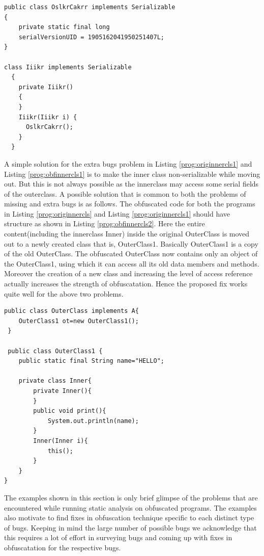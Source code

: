 \documentclass[twocolumn]{article}
\begin{document}
\tiny\begin{lstlisting}[frame=single]
 public class OslkrCakrr implements Serializable
{
	private static final long 
	serialVersionUID = 1905162041950251407L;
}

class Iiikr implements Serializable
  {
    private Iiikr()
    {
    }
    Iiikr(Iiikr i) {
      OslkrCakrr();
    }
  }
\end{lstlisting}
\normalsize
A simple solution for the extra bugs problem in Listing \ref{prog:originnercls1} and Listing \ref{prog:obfinnercls1} is to make the inner class non-serializable while moving out. But 
this is not always possible as the innerclass may access some serial fields of the outerclass. A possible solution that is common to both the problems of missing and extra bugs is as 
follows. The obfuscated code for both the programs in Listing \ref{prog:originnercls} and Listing \ref{prog:originnercls1} should have structure as shown in Listing \ref{prog:obfinnercls2}.
Here the entire content(including the innerclass Inner) inside the original OuterClass is moved out to a newly created class that is, OuterClass1. Basically OuterClass1 is a copy of the 
old OuterClass. The obfuscated OuterClass now contains only an object of the OuterClass1, using which it can access all its old data members and methods. Moreover the creation of a new 
class and increasing the level of access reference actually increases the strength of obfuscatation. Hence the proposed fix works quite well for the above two problems.
\tiny\begin{lstlisting}[frame=single]
 public class OuterClass implements A{
	OuterClass1 ot=new OuterClass1();
 }
 
 public class OuterClass1 {
	public static final String name="HELLO";
	
	private class Inner{
		private Inner(){
		}
		public void print(){
			System.out.println(name);
		}
		Inner(Inner i){
			this();
		}
	}
}
\end{lstlisting}
\normalsize

The examples shown in this section is only brief glimpse of the problems that are encountered while running static analysis on obfuscated programs. The examples also motivate to find 
fixes in obfuscation technique specific to each distinct type of bugs. Keeping in mind the large number of possible bugs we acknowledge that this requires a lot of effort in surveying 
bugs and coming up with fixes in obfuscatation for the respective bugs.
\end{document}
